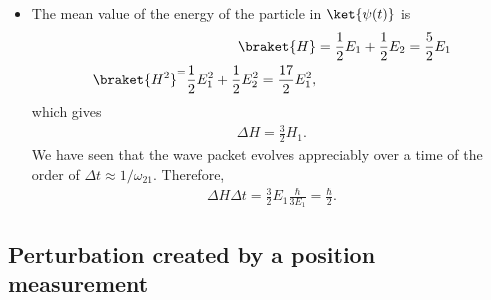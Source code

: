 \begin{itemize}[itemsep=0pt,topsep=0pt]
    \item The mean value of the energy of the particle in $\ket{\psi(t)}$ is 
    \begin{align*}
        \braket{H}&=\frac{1}{2}E_1+\frac{1}{2}E_2=\frac{5}{2}E_1\\
        \braket{H^2}^=\frac{1}{2}E_1^2+\frac{1}{2}E_2^2=\frac{17}{2}E_1^2,
    \end{align*}
    which gives 
    \begin{align*}
        \Delta H=\frac{3}{2}H_1.
    \end{align*}
    We have seen that the wave packet evolves appreciably over a time of the order of $\Delta t\approx1/\omega_{21}$. Therefore,
    \begin{align}
        \Delta H\Delta t=\frac{3}{2}E_1\frac{\hbar}{3E_1}=\frac{\hbar}{2}.
    \end{align}
\end{itemize}

\subsection{Perturbation created by a position measurement}